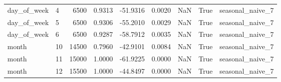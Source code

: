 \begin{table}
\begin{tabular}{llrrrrrrl}
day\_of\_week & 4 & 6500 & 0.9313 & -51.9316 & 0.0020 & NaN & True & seasonal\_naive\_7 \\
day\_of\_week & 5 & 6500 & 0.9306 & -55.2010 & 0.0029 & NaN & True & seasonal\_naive\_7 \\
day\_of\_week & 6 & 6500 & 0.9287 & -58.7912 & 0.0035 & NaN & True & seasonal\_naive\_7 \\
month & 10 & 14500 & 0.7960 & -42.9101 & 0.0084 & NaN & True & seasonal\_naive\_7 \\
month & 11 & 15000 & 1.0000 & -61.9225 & 0.0000 & NaN & True & seasonal\_naive\_7 \\
month & 12 & 15500 & 1.0000 & -44.8497 & 0.0000 & NaN & True & seasonal\_naive\_7 \\
\bottomrule
\end{tabular}
\end{table}
